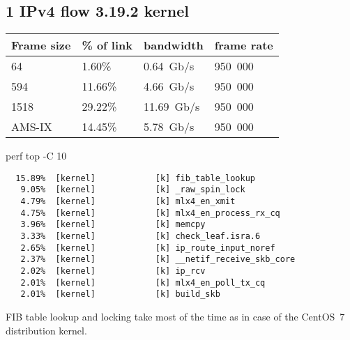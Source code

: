 
\subsection{1 IPv4 flow 3.19.2 kernel}
\begin{tabular}{ | l | l | l | l | }
\hline
Frame size & \% of link & bandwidth & frame rate \\
\hline
64     &  1.60\% &  0.64~Gb/s & 950~000 \\
594    & 11.66\% &  4.66~Gb/s & 950~000 \\
1518   & 29.22\% & 11.69~Gb/s & 950~000 \\
AMS-IX & 14.45\% &  5.78~Gb/s & 950~000 \\
\hline
\end{tabular}



perf top -C 10
\begin{lstlisting}
  15.89%  [kernel]            [k] fib_table_lookup
   9.05%  [kernel]            [k] _raw_spin_lock
   4.79%  [kernel]            [k] mlx4_en_xmit
   4.75%  [kernel]            [k] mlx4_en_process_rx_cq
   3.96%  [kernel]            [k] memcpy
   3.33%  [kernel]            [k] check_leaf.isra.6
   2.65%  [kernel]            [k] ip_route_input_noref
   2.37%  [kernel]            [k] __netif_receive_skb_core
   2.02%  [kernel]            [k] ip_rcv
   2.01%  [kernel]            [k] mlx4_en_poll_tx_cq
   2.01%  [kernel]            [k] build_skb
\end{lstlisting}
FIB table lookup and locking take most of the time as in case of the CentOS~7 distribution kernel.
